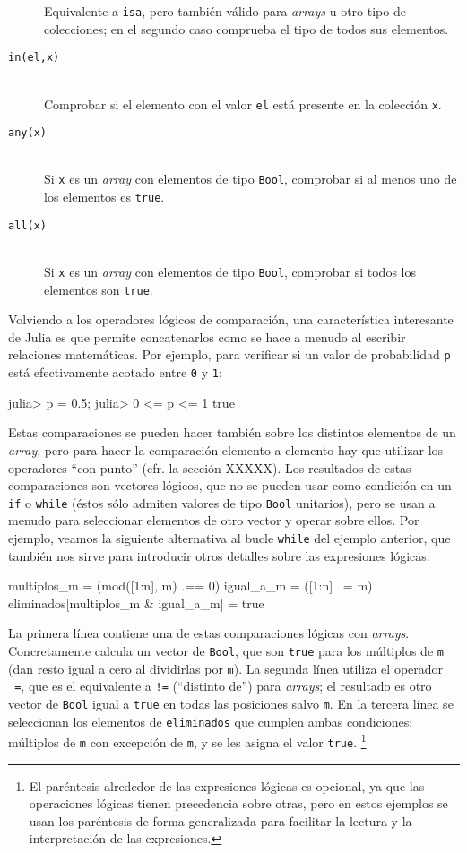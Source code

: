 ﻿\documentclass{article}
\newcommand{\code}{\texttt}
\begin{document}
\begin{description}
  Equivalente a \code{isa}, pero también válido para \emph{arrays} u otro tipo de colecciones; en el segundo caso comprueba el tipo de todos sus elementos.
  \item[\code{in(el,x)}] \hfill \\
  Comprobar si el elemento con el valor \code{el} está presente en la colección \code{x}.
  \item[\code{any(x)}] \hfill \\
  Si \code{x} es un \emph{array} con elementos de tipo \code{Bool}, comprobar si al menos uno de los elementos es \code{true}.
  \item[\code{all(x)}}] \hfill \\
  Si \code{x} es un \emph{array} con elementos de tipo \code{Bool}, comprobar si todos los elementos son \code{true}.
\end{description}

Volviendo a los operadores lógicos de comparación, una característica interesante de Julia es que permite concatenarlos como se hace a menudo al escribir relaciones matemáticas. Por ejemplo, para verificar si un valor de probabilidad \code{p} está efectivamente acotado entre \code{0} y \code{1}:

julia> p = 0.5;
julia> 0 <= p <= 1
true

Estas comparaciones se pueden hacer también sobre los distintos elementos de un \emph{array}, pero para hacer la comparación elemento a elemento hay que utilizar los operadores ``con punto'' (cfr. la sección XXXXX). Los resultados de estas comparaciones son vectores lógicos, que no se pueden usar como condición en un \code{if} o \code{while} (éstos sólo admiten valores de tipo \code{Bool} unitarios), pero se usan a menudo para seleccionar elementos de otro vector y operar sobre ellos. Por ejemplo, veamos la siguiente alternativa al bucle \code{while} del ejemplo anterior, que también nos sirve para introducir otros detalles sobre las expresiones lógicas:

multiplos_m = (mod([1:n], m) .== 0)
igual_a_m = ([1:n] ~= m)
eliminados[multiplos_m & igual_a_m] = true

La primera línea contiene una de estas comparaciones lógicas con \emph{arrays}. Concretamente calcula un vector de \code{Bool}, que son \code{true} para los múltiplos de \code{m} (dan resto igual a cero al dividirlas por \code{m}). La segunda línea utiliza el operador \code{~=}, que es el equivalente a \code{!=} (``distinto de'') para \emph{arrays}; el resultado es otro vector de \code{Bool} igual a \code{true} en todas las posiciones salvo \code{m}. En la tercera línea se seleccionan los elementos de \code{eliminados} que cumplen ambas condiciones: múltiplos de \code{m} con excepción de \code{m}, y se les asigna el valor \code{true}.%
\footnote{%
El paréntesis alrededor de las expresiones lógicas es opcional, ya que las operaciones lógicas tienen precedencia sobre otras, pero en estos ejemplos se usan los paréntesis de forma generalizada para facilitar la lectura y la interpretación de las expresiones.%
}
\end{document}
